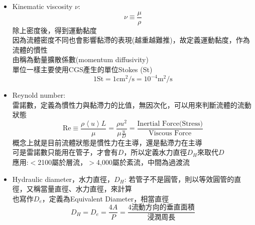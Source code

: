 \documentclass[../main.tex]{subfiles}
\begin{document}
\begin{itemize}
  \item Kinematic viscosity $\nu$:
    \begin{equation}
      \nu \equiv \frac{\mu}{\rho}
    \end{equation}
    除上密度後，得到運動黏度\\
    因為流體密度不同也會影響黏滯的表現(越重越難推)，故定義運動黏度，作為流體的慣性\\
    由稱為動量擴散係數(momentum diffusivity)\\
    單位一樣主要使用CGS產生的單位Stokes (St)
    \begin{equation}
      1 \textrm{St} = 1 \textrm{cm}^2/\textrm{s} = 10^{-4} \textrm{m}^2/\textrm{s}
    \end{equation}
  \item Reynold number:\\
    雷諾數，定義為慣性力與黏滯力的比值，無因次化，可以用來判斷流體的流動狀態
    \begin{equation}
      \boxed{\text{Re} \equiv \frac{\rho \left<u\right> L}{\mu} }= \frac{\rho u^2}{\mu\frac{u}{D}} = \frac{\text{Inertial Force(Stress)}}{\text{Viscous Force}}
    \end{equation}
    概念上就是目前流體狀態是慣性力在主導，還是黏滯力在主導\\
    可是雷諾數只能用在管子，才會有$D$，所以定義水力直徑$D_H$來取代$D$\\
    應用:$<$2100屬於層流，$>$4,000屬於紊流，中間為過渡流
  \item Hydraulic diameter，水力直徑，$D_H$:
    若管子不是圓管，則以等效圓管的直徑，又稱當量直徑、水力直徑，來計算\\
    也寫作$D_e$，定義為Equivalent Diameter，相當直徑
    \begin{equation}
      D_H = D_e = \frac{4A}{P} = \frac{4 \text{流動方向的垂直面積}}{\text{浸潤周長}}
    \end{equation}
    \begin{figure}[H]
      \centering
\end{figure}
\end{itemize}
\end{document}
